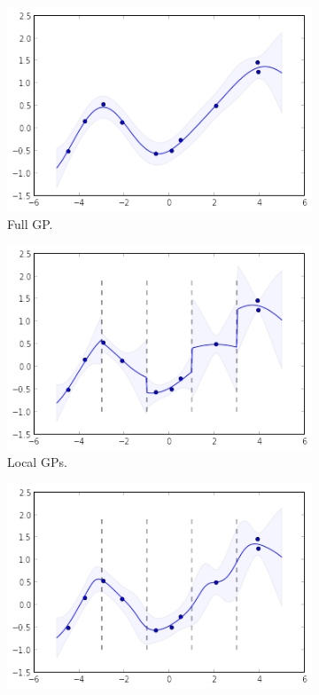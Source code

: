 \documentclass{article}
\begin{document}
\begin{figure}
\centering

\begin{subfigure}[t]{.30\textwidth}
                \includegraphics[width=\textwidth]{toy_gp_posterior}
                \caption{Full GP. }
                \label{fig:gp}
        \end{subfigure}
\qquad
\begin{subfigure}[t]{.30\textwidth}
  \includegraphics[width=\textwidth]{toy_lgp_posterior}
  \caption{Local GPs.}
  \label{fig:local}
\end{subfigure}
\qquad
\begin{subfigure}[t]{.30\textwidth}
  \includegraphics[width=\textwidth]{toy_bcm_posterior}

\end{subfigure}
\end{figure}
\end{document}
